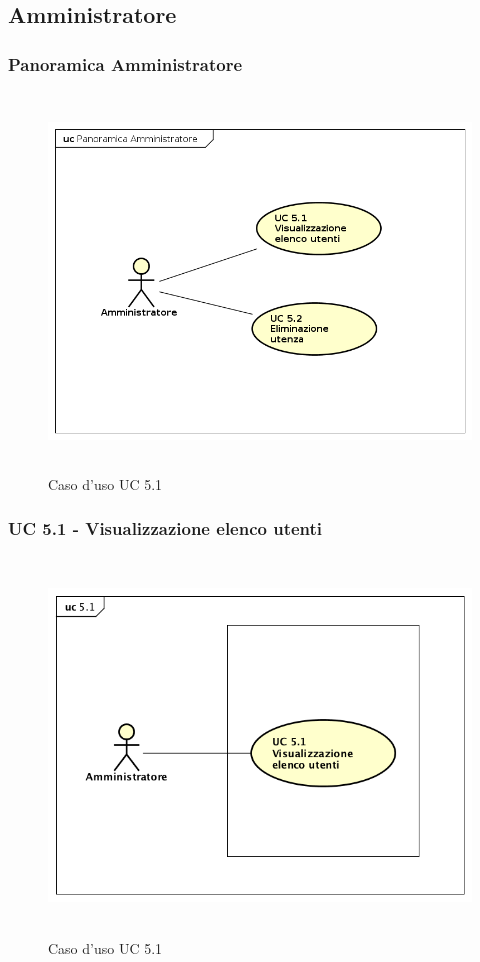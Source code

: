 \subsection{Amministratore}


\subsubsection{Panoramica Amministratore}
\begin{figure}[H]
\centering
\includegraphics[width=17cm, height=10cm]{img/PanoramicaAmministratore.png} 
\caption{Caso d'uso UC 5.1}
\end{figure}



\subsubsection{UC 5.1 - Visualizzazione elenco utenti}

\begin{figure}[H]
\centering
\includegraphics[width=17cm, height=10cm]{img/UC51.png} 
\caption{Caso d'uso UC 5.1}
\end{figure}


